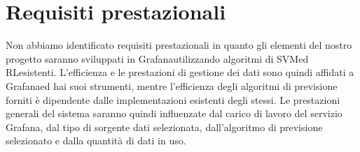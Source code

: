 \section*{Requisiti prestazionali}
	Non abbiamo identificato requisiti prestazionali in quanto gli elementi del nostro progetto saranno sviluppati in Grafana\glosp utilizzando algoritmi di SVM\glosp ed RL\glosp esistenti. L'efficienza e le prestazioni di gestione dei dati sono quindi affidati a Grafana\glosp ed hai suoi strumenti, mentre l'efficienza degli algoritmi di previsione forniti è dipendente dalle implementazioni esistenti degli stessi. Le prestazioni generali del sistema saranno quindi influenzate dal carico di lavoro del servizio Grafana\glosp, dal tipo di sorgente dati selezionata, dall'algoritmo di previsione selezionato e dalla quantità di dati in uso.